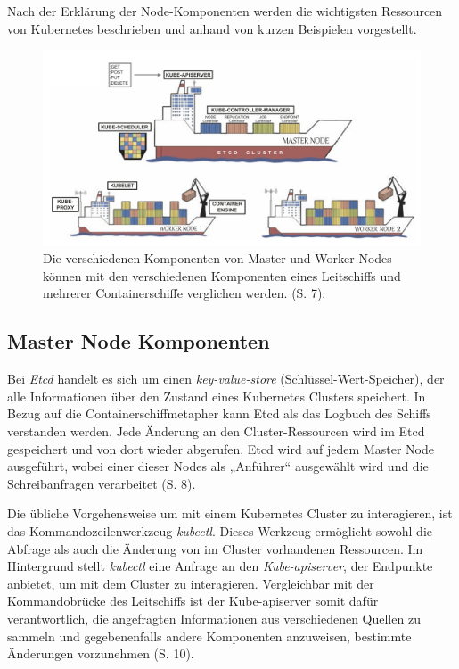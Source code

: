 \documentclass[11pt,a4paper]{article}
\begin{document}
Nach der Erklärung der Node-Komponenten werden die wichtigsten Ressourcen
von Kubernetes beschrieben und anhand von kurzen Beispielen vorgestellt.

\begin{figure}[h]
  \centering
  \includegraphics[width=1\textwidth]{./media/Schmeling_Dargatz_2022 S.7.png}
  \caption{Die verschiedenen Komponenten von Master und Worker Nodes können mit den
    verschiedenen Komponenten eines Leitschiffs und mehrerer Containerschiffe verglichen werden. \cite{Schmeling_Dargatz_2022} (S. 7).}
  \label{fig:containerschiff}
\end{figure}

\subsection{Master Node Komponenten}
\label{sec:MasterNodeKomponenten}
Bei \emph{Etcd} handelt es sich um einen \emph{key-value-store} (Schlüssel-Wert-Speicher),
der alle Informationen über den Zustand eines Kubernetes Clusters speichert.
In Bezug auf die Containerschiffmetapher kann Etcd als das Logbuch des Schiffs verstanden werden.
Jede Änderung an den Cluster-Ressourcen wird im Etcd gespeichert und von dort wieder abgerufen.
Etcd wird auf jedem Master Node ausgeführt, wobei einer dieser Nodes als „Anführer“
ausgewählt wird und die Schreibanfragen verarbeitet \cite{Schmeling_Dargatz_2022} (S. 8).

Die übliche Vorgehensweise um mit einem Kubernetes Cluster zu interagieren, ist das Kommandozeilenwerkzeug \emph{kubectl}.
Dieses Werkzeug ermöglicht sowohl die Abfrage als auch die Änderung von im Cluster vorhandenen Ressourcen.
Im Hintergrund stellt \emph{kubectl} eine Anfrage an den \emph{Kube-apiserver}, der Endpunkte anbietet,
um mit dem Cluster zu interagieren. Vergleichbar mit der Kommandobrücke des Leitschiffs ist der Kube-apiserver
somit dafür verantwortlich, die angefragten Informationen
aus verschiedenen Quellen zu sammeln und gegebenenfalls andere Komponenten anzuweisen, bestimmte Änderungen vorzunehmen \cite{Schmeling_Dargatz_2022} (S. 10).
\end{document}
